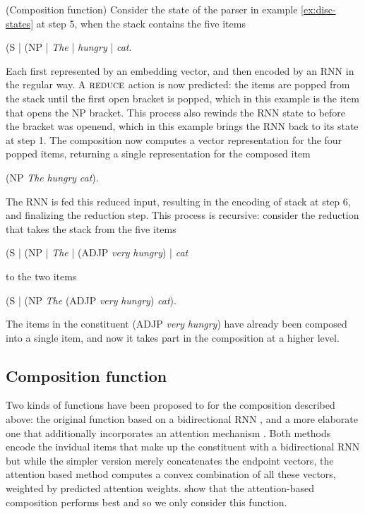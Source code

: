 \begin{example}{(Composition function)}
  Consider the state of the parser in example \ref{ex:disc-states} at step 5, when the stack contains the five items
  \begin{center}
    (S | (NP | \textit{The} | \textit{hungry} | \textit{cat}.
  \end{center}
  Each first represented by an embedding vector, and then encoded by an RNN in the regular way. A $\textsc{reduce}$ action is now predicted: the items are popped from the stack until the first open bracket is popped, which in this example is the item that opens the NP bracket. This process also rewinds the RNN state to before the bracket was openend, which in this example brings the RNN back to its state at step 1. The composition now computes a vector representation for the four popped items, returning a single representation for the composed item
  \begin{center}
    (NP \textit{The} \textit{hungry} \textit{cat}).
  \end{center}
  The RNN is fed this reduced input, resulting in the encoding of stack at step 6, and finalizing the reduction step. This process is recursive: consider the reduction that takes the stack from the five items
  \begin{center}
    (S | (NP | \textit{The} | (ADJP \textit{very} \textit{hungry}) | \textit{cat}
  \end{center}
  to the two items
  \begin{center}
    (S | (NP \textit{The} (ADJP \textit{very} \textit{hungry}) \textit{cat}).
  \end{center}
  The items in the constituent (ADJP \textit{very} \textit{hungry}) have already been composed into a single item, and now it takes part in the composition at a higher level.
\end{example}

\subsection{Composition function}
Two kinds of functions have been proposed to for the composition described above: the original function based on a bidirectional RNN \citep{dyer2016rnng}, and a more elaborate one that additionally incorporates an attention mechanism \citep{kuncoro2017syntax}. Both methods encode the invidual items that make up the constituent with a bidirectional RNN but while the simpler version merely concatenates the endpoint vectors, the attention based method computes a convex combination of all these vectors, weighted by predicted attention weights. \citet{kuncoro2017syntax} show that the attention-based composition performs best and so we only consider this function.

